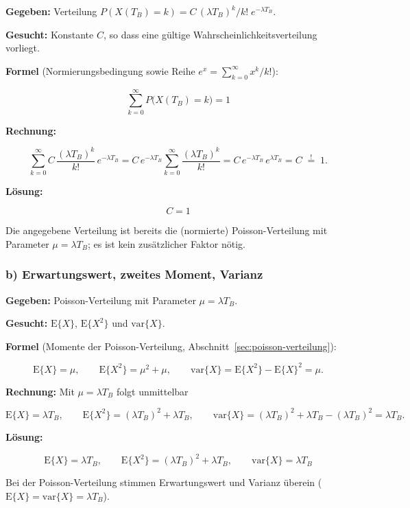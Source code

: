 \begin{beispiel}

\textbf{Gegeben:} Verteilung $P(X(T_B)=k) = C\,(\lambda T_B)^k/k!\; e^{-\lambda T_B}$.

\textbf{Gesucht:} Konstante $C$, so dass eine gültige Wahrscheinlichkeitsverteilung
vorliegt.

\textbf{Formel} (Normierungsbedingung sowie Reihe $e^{x} = \sum_{k=0}^{\infty} x^k/k!$):

$$
\sum_{k=0}^{\infty} P\bigl(X(T_B) = k\bigr) = 1
$$

\textbf{Rechnung:}

$$
\sum_{k=0}^{\infty} C\, \frac{(\lambda T_B)^k}{k!}\, e^{-\lambda T_B}
= C\, e^{-\lambda T_B} \sum_{k=0}^{\infty} \frac{(\lambda T_B)^k}{k!}
= C\, e^{-\lambda T_B}\, e^{\lambda T_B}
= C \;\overset{!}{=}\; 1.
$$

\textbf{Lösung:}

$$
\boxed{\;C = 1\;}
$$

Die angegebene Verteilung ist bereits die (normierte) Poisson-Verteilung mit
Parameter $\mu = \lambda T_B$; es ist kein zusätzlicher Faktor nötig.

\end{beispiel}

\subsubsection*{b) Erwartungswert, zweites Moment, Varianz}

\begin{beispiel}

\textbf{Gegeben:} Poisson-Verteilung mit Parameter $\mu = \lambda T_B$.

\textbf{Gesucht:} $\mathrm{E}\{X\}$, $\mathrm{E}\{X^2\}$ und $\mathrm{var}\{X\}$.

\textbf{Formel} (Momente der Poisson-Verteilung, Abschnitt~\ref{sec:poisson-verteilung}):

$$
\mathrm{E}\{X\} = \mu, \qquad \mathrm{E}\{X^2\} = \mu^2 + \mu, \qquad
\mathrm{var}\{X\} = \mathrm{E}\{X^2\} - \mathrm{E}\{X\}^2 = \mu.
$$

\textbf{Rechnung:} Mit $\mu = \lambda T_B$ folgt unmittelbar

$$
\mathrm{E}\{X\} = \lambda T_B, \qquad
\mathrm{E}\{X^2\} = (\lambda T_B)^2 + \lambda T_B, \qquad
\mathrm{var}\{X\} = (\lambda T_B)^2 + \lambda T_B - (\lambda T_B)^2 = \lambda T_B.
$$

\textbf{Lösung:}

$$
\boxed{\;\mathrm{E}\{X\} = \lambda T_B, \qquad
\mathrm{E}\{X^2\} = (\lambda T_B)^2 + \lambda T_B, \qquad
\mathrm{var}\{X\} = \lambda T_B\;}
$$

Bei der Poisson-Verteilung stimmen Erwartungswert und Varianz überein
($\mathrm{E}\{X\} = \mathrm{var}\{X\} = \lambda T_B$).

\end{beispiel}

